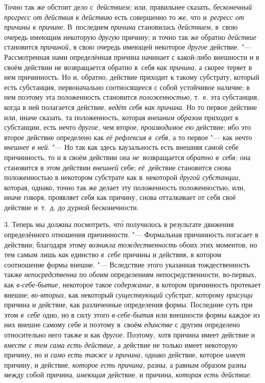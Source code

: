 Точно так же обстоит дело с~{\em действием;} или, правильнее сказать,
{\em бесконечный прогресс от действия к действию} есть совершенно то же, что
и~{\em регресс от причины к причине}. В~последнем {\em причина} становилась
{\em действием,} в~свою очередь имеющим некоторую {\em другую} причину; и точно
так же обратно {\em действие} становится {\em причиной,} в свою очередь имеющей
некоторое {\em другое} действие. "--- Рассмотренная нами определённая причина
начинает с какой-либо внешности и в своём действии не возвращается обратно
в~себя {\em как причина,} а скорее теряет в нем причинность. Но и, обратно,
действие приходит к такому субстрату, который есть субстанция, первоначально
соотносящееся с собой устойчивое наличие; в нем поэтому эта положенность
становится {\em положенностью,} т.~е. эта субстанция, когда в ней полагается
действие, {\em ведёт себя как причина}. Но то первое действие или, иначе
сказать, та положенность, которая {\em внешним образом} приходит к субстанции,
есть нечто {\em другое,} чем второе, {\em производимое ею} действие; ибо это
второе действие определено как {\em её рефлексия} {\em в~себя,} а то первое
"--- как нечто {\em внешнее в ней}. "--- Но так как здесь каузальность есть
внешняя самой себе причинность, то и в своём действии она {\em не}~возвращается
{\em обратно в~себя;} она становится в этом действии {\em внешней} себе;
{\em её}~действие становится снова положенностью в некотором субстрате как
в~некоторой {\em другой субстанции,} которая, однако, точно так же делает эту
положенность положенностью, или, иначе говоря, проявляет себя как причину,
снова отталкивает от себя своё действие и~т.~д. до дурной бесконечности.

3. Теперь мы должны посмотреть, чт\'{о} получилось в результате движения
определённого отношения причинности. "--- Формальная причинность погасает в
действии; благодаря этому {\em возникла тождественность} обоих этих моментов,
но тем самым лишь {\em как} единство {\em в~себе} причины и действия, в котором
соотношение формы внешне. "--- Вследствие этого указанная тождественность также
{\em непосредственна} по обоим определениям непосредственности, во-первых, как
{\em в-себе-бытие,} некоторое такое {\em содержание,} в котором причинность
протекает внешне; {\em во-вторых,} как некоторый {\em существующий} субстрат,
которому {\em присущи} причина и действие, как различенные определения формы.
Последние суть при этом {\em в~себе} одно, но в силу этого {\em в-себе-бытия}
или внешности формы каждое из них внешне самому себе и поэтому в~своём
{\em единстве} с другим определено относительно него также и как {\em другое}.
Поэтому, хотя причина имеет действие и {\em вместе с тем сама есть действие,}
а действие не только имеет некоторую причину, но и
{\em само есть также и причина,} однако действие, которое {\em имеет} причину,
и действие, {\em которое есть причина,} разны, а равным образом разны между
собой причина, {\em имеющая} действие, и причина, {\em которая есть действие}.

